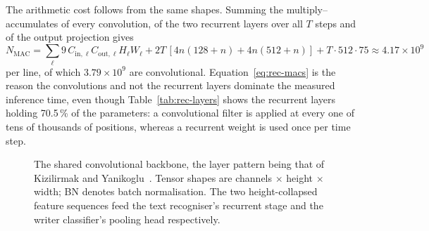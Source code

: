 The arithmetic cost follows from the same shapes. Summing the multiply--accumulates of every convolution, of the two recurrent layers over all $T$ steps and of the output projection gives
\begin{equation}
N_{\mathrm{MAC}}=\sum_\ell 9\,C_{\mathrm{in},\ell}C_{\mathrm{out},\ell}H_\ell W_\ell+2T\,[4n(128+n)+4n(512+n)]+T\cdot512\cdot75\approx4.17\times10^9
\label{eq:rec-macs}
\end{equation}
per line, of which $3.79\times10^9$ are convolutional. Equation~\ref{eq:rec-macs} is the reason the convolutions and not the recurrent layers dominate the measured inference time, even though Table~\ref{tab:rec-layers} shows the recurrent layers holding 70.5\,\% of the parameters: a convolutional filter is applied at every one of tens of thousands of positions, whereas a recurrent weight is used once per time step.


\begin{figure}[h]
\centering
{}
\caption{The shared convolutional backbone, the layer pattern being that of Kizilirmak and Yanikoglu~\cite[p.~9]{kizilirmak2023}. Tensor shapes are channels $\times$ height $\times$ width; BN denotes batch normalisation. The two height-collapsed feature sequences feed the text recogniser's recurrent stage and the writer classifier's pooling head respectively.}
\label{fig:rec-arch}
\end{figure}

